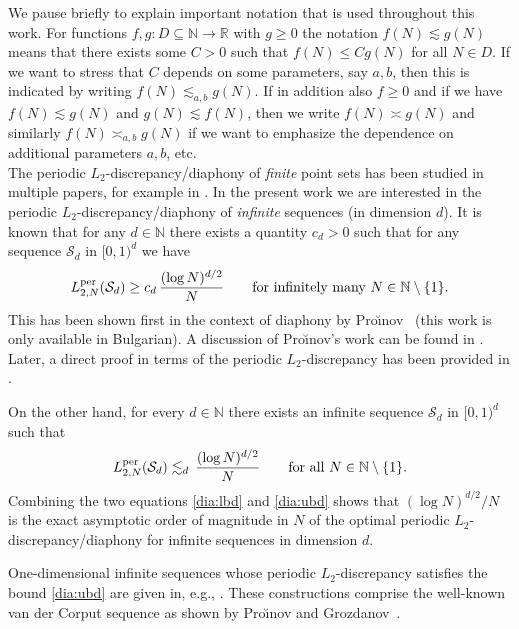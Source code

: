 \documentclass[12pt, a4paper]{article}
\def\S{\mathcal{S}}
\newcommand{\peter}[1]{\begingroup\color{violet}#1\endgroup}
\newcommand{\NN}{{\mathbb{N}}} %
\begin{document}
We pause briefly to explain important notation that is used throughout this work. For functions $f,g:D \subseteq \mathbb{N} \rightarrow \mathbb{R}$ with $g \ge 0$ the notation $f(N) \lesssim g(N)$ means that there exists some $C>0$ such that $f(N) \le C g(N)$ for all $N \in D$. If we want to stress that $C$ depends on some parameters, say $a,b$, then this is indicated by writing $f(N) \lesssim_{a,b} g(N)$. If in addition also $f \ge 0$ and if we have $f(N) \lesssim g(N)$ and $g(N) \lesssim f(N)$, then we write $f(N) \asymp g(N)$ and similarly $f(N) \asymp_{a,b} g(N)$ if we want to emphasize the dependence on additional parameters $a, b$, etc.\\ 

The periodic $L_2$-discrepancy/diaphony of {\it finite} point sets has been studied in multiple papers, for example in \cite{HKP20,HOe,HMOU,KP22b}. In the present work we are interested in the periodic $L_2$-discrepancy/diaphony of \textit{infinite} sequences (in dimension $d$). It is known that for any $d \in \NN$ there exists a quantity $c_d>0$ such that for any sequence $\S_d$ in $[0,1)^d$ we have 
\begin{equation}\label{dia:lbd}
L_{2,N}^{{\rm per}}(\S_d) \ge c_d \, \frac{(\log N)^{d/2}}{N} \qquad \mbox{for infinitely many } N \in \NN\setminus\{1\}.
\end{equation}
This has been shown first in the context of diaphony by Pro{\u\i}nov~\cite{pro2000} (this work is only available in Bulgarian). A discussion of Pro{\u\i}nov's work can be found in \cite{kirk}. Later, a direct proof in terms of the periodic $L_2$-discrepancy has been provided in \cite{KP22a}. 


On the other hand, for every $d \in \NN$ there exists an infinite sequence $\S_d$ in $[0,1)^d$ such that 
\begin{equation}\label{dia:ubd}
L_{2,N}^{{\rm per}}(\S_d) \lesssim_d \, \frac{(\log N)^{d/2}}{N} \qquad \mbox{for all } N \in \NN\setminus\{1\}.
\end{equation}
Combining the two equations \eqref{dia:lbd} and \eqref{dia:ubd} shows that 
$(\log N)^{d/2}/N$ is the exact asymptotic order of magnitude in $N$ of the optimal periodic $L_2$-discrepancy/diaphony for infinite sequences in dimension $d$. 

One-dimensional %
infinite sequences whose periodic $L_2$-discrepancy satisfies the bound \eqref{dia:ubd} are given in, e.g., \cite{chafa,g96,pag,pro1988a,pg}. These constructions comprise the well-known van der Corput sequence as shown by Pro{\u\i}nov and Grozdanov~\cite{pg}. 
\end{document}
